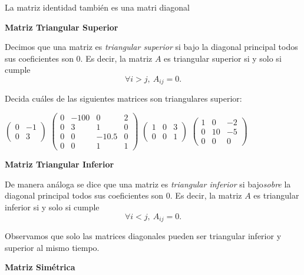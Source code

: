 \documentclass[12pt]{book}
\def\pq{\vspace{0.5cm}}
\begin{document}
La matriz identidad también es una matri diagonal

 \pq

{\bf Matriz Triangular Superior}

Decimos que una matriz es  \emph{triangular superior} si bajo la diagonal principal todos sus coeficientes son 0.
Es decir, la matriz $A$ es triangular superior si y solo si cumple
  $$\forall i>j,\ A_{ij}=0.$$

Decida cuáles de las siguientes matrices son triangulares superior:

\begin{center}
$\left(\begin{array}{rr}0& -1\\ 0& 3\end{array}\right)$\qquad
$\left(\begin{array}{rrrr}0& -100&0&2\\ 0& 3& 1&0\\ 0&0&-10.5&0\\0&0&1&1\end{array}\right)$\qquad
$\left(\begin{array}{rrr}1& 0&3\\ 0& 0&1\end{array}\right)$\qquad
$\left(\begin{array}{rrr}1& 0&-2\\ 0& 10&-5\\0&0&0\end{array}\right)$
\end{center}
 
\pq 

{\bf Matriz Triangular Inferior}

De manera análoga se dice que una matriz es \emph{triangular inferior} si bajo\emph{sobre} la diagonal principal todos sus coeficientes son 0.
Es decir, la matriz $A$ es triangular inferior si y solo si cumple
  $$\forall i<j,\ A_{ij}=0.$$

Observamos que solo las matrices diagonales pueden ser triangular inferior y superior al mismo tiempo.

 \pq 

{\bf Matriz Simétrica}
\end{document}
